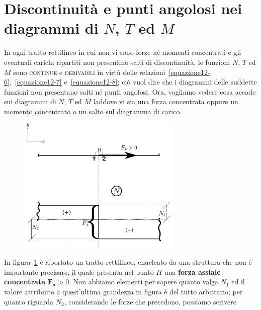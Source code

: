 \clearpage
\pagestyle{fancy}
\part{Discontinuità e punti angolosi nei diagrammi di $N$, $T$ ed $M$}
\setcounter{section}{1}
In ogni tratto rettilineo in cui non vi sono forze né momenti concentrati e gli eventuali carichi ripartiti non presentino salti di discontinuità, le funzioni $N$, $T$ ed $M$ sono \textsc{continue} e \textsc{derivabili} in virtù delle relazioni~\eqref{equazione12-6},~\eqref{equazione12-7} e~\eqref{equazione12-8}; ciò vuol dire che i diagrammi delle suddette funzioni non presentano salti né punti angolosi. Ora, vogliamo vedere cosa accade sui diagrammi di $N$, $T$ ed $M$ laddove vi sia una forza concentrata oppure un momento concentrato o un salto sul diagramma di carico.
\renewcommand{\thefigure}{13~-~1}
\begin{figure}[ht]
\centering
\includegraphics[width=0.7\textwidth]{Immagini/Parte_13/Figura13_1/figura13_1.pdf}
\caption{}
\label{figura13-1}
\end{figure}
In figura~\ref{figura13-1} è riportato un tratto rettilineo, enucleato da una struttura che non è importante precisare, il quale presenta nel punto $H$ una \textbf{forza assiale concentrata} $\mathbf{F_{x}}>0$. Non abbiamo elementi per sapere quanto valga $N_1$ ed il valore attribuito a quest'ultima grandezza in figura è del tutto arbitrario; per quanto riguarda $N_2$, considerando le forze che precedono, possiamo scrivere 
